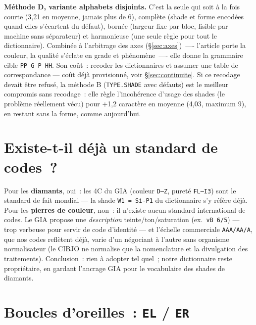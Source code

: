 \documentclass[11pt,a4paper]{article}
\newcommand{\code}[1]{\texttt{#1}}
\begin{document}
\textbf{Méthode D, variante alphabets disjoints.} C'est la seule qui soit à
la fois courte (3,21 en moyenne, jamais plus de 6), complète (shade et forme
encodées quand elles s'écartent du défaut), bornée (largeur fixe par bloc,
lisible par machine sans séparateur) et harmonieuse (une seule règle pour
tout le dictionnaire). Combinée à l'arbitrage des axes (§\ref{sec:axes})~—- l'article porte
la couleur, la qualité s'éclate en grade et phénomène~—- elle donne la
grammaire cible \code{PP\,G\,P\,HH}. Son coût~: recoder les dictionnaires
et assumer une table de correspondance — coût déjà
provisionné, voir §\ref{sec:continuite}. Si ce recodage devait être refusé,
la méthode B (\code{TYPE.SHADE} avec défauts) est le meilleur compromis sans
recodage~: elle règle l'incohérence d'usage des shades (le problème réellement
vécu) pour +1,2 caractère en moyenne (4,03, maximum 9), en restant sans
la forme, comme aujourd'hui.

\section{Existe-t-il d\'ej\`a un standard de codes~?}

Pour les \textbf{diamants}, oui~: les 4C du GIA (couleur \code{D--Z},
puret\'e \code{FL--I3}) sont le standard de fait mondial — la shade
\code{W1 = Si-P1} du dictionnaire s'y r\'ef\`ere d\'ej\`a. Pour les
\textbf{pierres de couleur}, non~: il n'existe aucun standard international
de codes. Le GIA propose une \emph{description} teinte/ton/saturation
(ex.~\code{vB 6/5}) — trop verbeuse pour servir de code d'identit\'e — et
l'\'echelle commerciale \code{AAA/AA/A}, que nos codes refl\`etent d\'ej\`a,
varie d'un n\'egociant \`a l'autre sans organisme normalisateur (le CIBJO ne
normalise que la nomenclature et la divulgation des traitements). Conclusion~:
rien \`a adopter tel quel~; notre dictionnaire reste propri\'etaire, en
gardant l'ancrage GIA pour le vocabulaire des shades de diamants.

\section{Boucles d'oreilles~: \code{EL} / \code{ER}}
\end{document}

